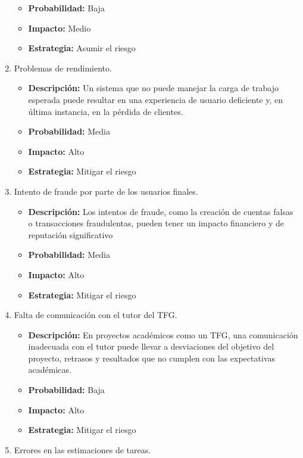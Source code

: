 \begin{enumerate}
\begin{itemize}
        \item \textbf{Probabilidad:} Baja
        \item \textbf{Impacto:} Medio
        \item \textbf{Estrategia:} Asumir el riesgo
    \end{itemize}
    \item Problemas de rendimiento.
    \begin{itemize}
        \item \textbf{Descripción:} Un sistema que no puede manejar la carga de trabajo esperada puede resultar en una experiencia de usuario deficiente y,
         en última instancia, en la pérdida de clientes.
        \item \textbf{Probabilidad:} Media
        \item \textbf{Impacto:} Alto
        \item \textbf{Estrategia:} Mitigar el riesgo
    \end{itemize}
    \item Intento de fraude por parte de los usuarios finales.
    \begin{itemize}
        \item \textbf{Descripción:} Los intentos de fraude, como la creación de cuentas falsas o transacciones fraudulentas, pueden tener un impacto financiero y de reputación significativo
        \item \textbf{Probabilidad:} Media
        \item \textbf{Impacto:} Alto
        \item \textbf{Estrategia:} Mitigar el riesgo
    \end{itemize}
    \item Falta de comunicación con el tutor del TFG.
    \begin{itemize}
        \item \textbf{Descripción:} En proyectos académicos como un TFG, una comunicación inadecuada con el tutor puede llevar a desviaciones del objetivo del proyecto, 
        retrasos y resultados que no cumplen con las expectativas académicas.
        \item \textbf{Probabilidad:} Baja
        \item \textbf{Impacto:} Alto
        \item \textbf{Estrategia:} Mitigar el riesgo
    \end{itemize}
    \item Errores en las estimaciones de tareas.
    \begin{itemize}

\end{itemize}
\end{enumerate}
